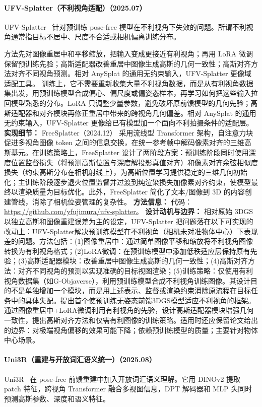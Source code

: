 \paragraph{UFV-Splatter（不利视角适配）（2025.07）}
UFV-Splatter~\cite{2507_22342} 针对预训练 pose-free 模型在不利视角下失效的问题。所谓不利视角通常指目标不居中、尺度不合适或相机偏离训练分布。

方法先对图像重居中和平移缩放，把输入变成更接近有利视角；再用 LoRA 微调保留预训练先验；高斯适配器改善重居中图像生成高斯的几何一致性；高斯对齐方法对齐不同视角预测。相对 AnySplat 的通用无约束输入，UFV-Splatter 更像域适配工具。
训练上，它不需要重新收集大量不利视角数据，而是从有利视角数据集出发，用预训练模型合成偏心、偏尺度或偏姿态样本，再学习如何把这些输入拉回模型熟悉的分布。LoRA 只调整少量参数，避免破坏原前馈模型的几何先验；高斯适配器和对齐模块再修正重居中带来的跨视角几何偏差。相对 AnySplat 的通用无约束输入，UFV-Splatter 更像给已有模型加一个面向不利拍摄条件的适配层。
\textbf{实现细节：} FreeSplatter（2024.12） 采用流线型 Transformer 架构，自注意力块促进多视角图像 token 之间的信息交换，在统一参考帧中解码像素对齐的三维高斯基元。在训练策略上，FreeSplatter 设计了两阶段方案：预训练阶段同时使用深度位置监督损失（将预测高斯位置与深度解投影真值对齐）和像素对齐余弦相似度损失（约束高斯分布在相机射线上），为高斯位置学习提供稳定的三维几何初始化；主训练阶段逐步退火位置监督并过渡到纯渲染损失加像素对齐约束，使模型最终以渲染质量为目标优化。此外，FreeSplatter 简化了文本/图像到 3D 的内容创建管线，消除了相机位姿管理的复杂性。
\textbf{方法信息：} 代码：\url{https://github.com/yfujimura/ufv-splatter}。
\textbf{设计动机与边界：} 相对原始 3DGS 以独立高斯和图像重建误差为主的设定，UFV-Splatter 把问题落在以下可实现的改动上：UFV-Splatter解决预训练模型在不利视角（相机未对准物体中心）下表现差的问题。方法包括：(1)图像重居中：通过简单图像平移和缩放将不利视角图像转换为有利视角格式；(2)LoRA微调：在预训练模型中添加低秩适应层保持原有先验；(3)高斯适配器模块：改善重居中图像生成高斯的几何一致性；(4)高斯对齐方法：对齐不同视角的预测以实现准确的目标视图渲染；(5)训练策略：仅使用有利视角数据集（如G-Objaverse），利用预训练模型合成不利视角训练图像。其设计目的不是单独增加一个模块，而是用上述表示、监督或渲染约束消除原流程在目标任务中的具体失配。提出首个使预训练无姿态前馈3DGS模型适应不利视角的框架。通过图像重居中+LoRA微调利用有利视角的先验，设计高斯适配器模块增强几何一致性，提出高斯对齐方法和仅需有利图像的训练策略。适用时还应保留论文给出的边界：对极端视角偏移的效果可能下降；依赖预训练模型的质量；主要针对物体中心场景。
\paragraph{Uni3R（重建与开放词汇语义统一）（2025.08）}
Uni3R~\cite{2508_03643} 在 pose-free 前馈重建中加入开放词汇语义理解。它用 DINOv2 提取 patch 特征，跨视角 Transformer 融合多视图信息，DPT 解码器和 MLP 头同时预测高斯参数、深度和语义特征。

